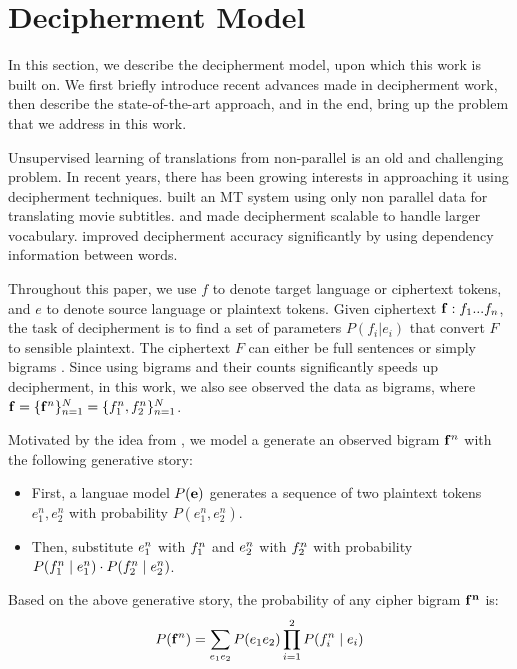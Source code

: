 \section{Decipherment Model}
In this section, we describe the decipherment model, upon which this work is built on. We first briefly introduce recent advances made in decipherment work, then describe the state-of-the-art approach, and in the end, bring up the problem that we address in this work. 

Unsupervised learning of translations from non-parallel is an old and challenging problem. In recent years, there has been growing interests in approaching it using decipherment techniques.  built an MT system using only non parallel data for translating movie subtitles.  and  made decipherment scalable to handle larger vocabulary.  improved decipherment accuracy significantly by using dependency information between words. 

Throughout this paper, we use $f$ to denote target language or ciphertext tokens, and $e$ to denote source language or plaintext tokens. Given ciphertext $\mathbf{f}:f_{1}...f_{n}$, the task of decipherment is to find a set of parameters $P(f_{i}|e_{i})$ that convert $F$ to sensible plaintext. The ciphertext $F$ can either be full sentences \cite{ravi-knight:2011,Nuhn:2012} or simply bigrams \cite{dou-knight:2013:EMNLP}. Since using bigrams and their counts significantly speeds up decipherment, in this work, we also see observed the data as bigrams, where $ \mathbf{f} = \{ \mathbf{f}^n \}_{n=1}^{N} = \{ f_1^n,f_2^n \}_{n=1}^{N} $. 

Motivated by the idea from , we model a generate an observed bigram $\mathbf{f}^n$ with the following generative story:

\begin{itemize}
\item  First, a languae model $P(\mathbf{e})$ generates a sequence of two plaintext tokens $e_{1}^n,e_{2}^n$ with probability $P(e_{1}^n,e_{2}^n)$.
\item  Then, substitute $e_{1}^n$ with $f_{1}^n$ and $e_{2}^n$ with $f_{2}^n$ with probability $P(f_{1}^n \mid e_{1}^n) \cdot P(f_{2}^n \mid e_{2}^n)$.
\end{itemize}

Based on the above generative story, the probability of any cipher bigram $\mathbf{f^n}$ is:
%
\[
\label{p_cipher}
P(\mathbf{f}^n) =  \sum_{e_{1} e_{2}} P(e_{1}e_{2}) \prod_{i=1}^{2}P(f_{i}^n \mid e_{i})
\]
%

